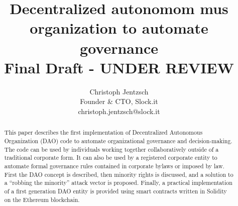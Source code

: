 \documentclass[9pt,oneside]{amsart}
\title{Decentralized autonomom mus organization to automate governance\\ {\smaller \textbf{Final Draft - UNDER REVIEW}}}
\author{
    Christoph Jentzsch\\
    Founder \& CTO, Slock.it\\
    christoph.jentzsch@slock.it
}
\begin{document}
\begin{abstract}
This paper describes the first implementation of Decentralized Autonomous Organization (DAO) code to automate organizational governance and decision-making. The code can be used by individuals working together collaboratively outside of a traditional corporate form. It can also be used by a registered corporate entity to automate formal governance rules contained in corporate bylaws or imposed by law. First the DAO concept is described, then minority rights is discussed, and a solution to a ``robbing the minority'' attack vector is proposed. Finally, a practical implementation of a first generation DAO entity is provided using smart contracts written in Solidity on the Ethereum blockchain.
\end{abstract}

\maketitle
\end{document}
